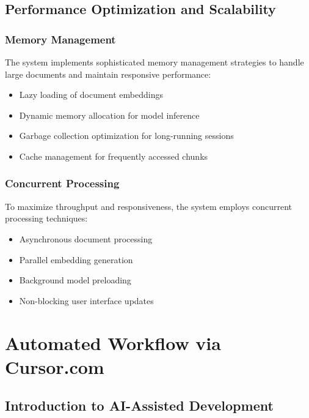 \documentclass[12pt,letterpaper]{article}
\begin{document}
\subsection{Performance Optimization and Scalability}

\subsubsection{Memory Management}

The system implements sophisticated memory management strategies to handle large documents and maintain responsive performance:

\begin{itemize}
    \item Lazy loading of document embeddings
    \item Dynamic memory allocation for model inference
    \item Garbage collection optimization for long-running sessions
    \item Cache management for frequently accessed chunks
\end{itemize}

\subsubsection{Concurrent Processing}

To maximize throughput and responsiveness, the system employs concurrent processing techniques:

\begin{itemize}
    \item Asynchronous document processing
    \item Parallel embedding generation
    \item Background model preloading
    \item Non-blocking user interface updates
\end{itemize}

\newpage

\section{Automated Workflow via Cursor.com}

\subsection{Introduction to AI-Assisted Development}
\end{document}
